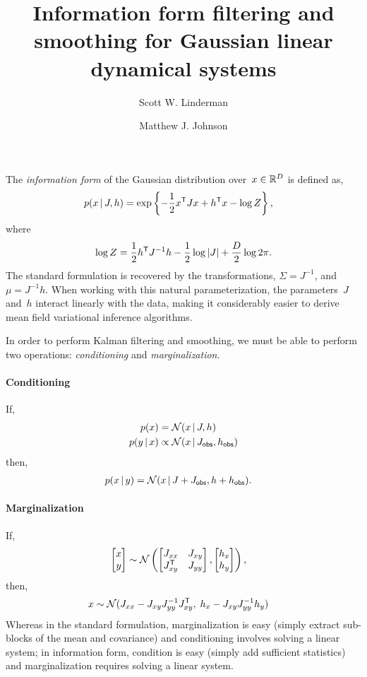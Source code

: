 \documentclass{article}
\title{Information form filtering and smoothing for Gaussian linear dynamical systems}
\author{Scott W. Linderman 
  \and
  Matthew J. Johnson 
}
\begin{document}
\singlespacing
\maketitle
\onehalfspacing

The \emph{information form} of the Gaussian distribution over~$x \in \mathbb{R}^D$ is defined as,
\begin{align}
  p(x \,|\, J, h) 
  &=  \exp \left \{ -\frac{1}{2} x^{\mathsf{T}} J x + h^{\mathsf{T}} x - \log Z \right \},
\end{align}
where
\begin{align}
  \log Z = \frac{1}{2} h^{\mathsf{T}} J^{-1} h - \frac{1}{2}\log |J| + \frac{D}{2}\log 2 \pi.
\end{align}
The standard formulation is recovered by the
transformations, $\Sigma = J^{-1}$, and $\mu = J^{-1} h$. When working
with this natural parameterization, the parameters~$J$ and~$h$
interact linearly with the data, making it considerably easier to
derive mean field variational inference algorithms.

In order to perform Kalman filtering and smoothing, we must be able to perform
two operations: \emph{conditioning} and \emph{marginalization}. 

\paragraph{Conditioning}
If,
\begin{align}
  p(x) &= \mathcal{N}(x \,|\, J, h) \\
  p(y \,|\, x) &\propto \mathcal{N}(x \,|\, J_{\sf obs}, h_{\sf obs}) 
\end{align}
then,
\begin{align}
  p(x \,|\, y) &= \mathcal{N}(x \,|\, J + J_{\sf obs}, h + h_{\sf obs}).
\end{align}

\paragraph{Marginalization}
If,
\begin{align}
  \begin{bmatrix} x \\ y  \end{bmatrix}
  &\sim
  \mathcal{N} \left(
  \begin{bmatrix} 
    J_{xx}        & J_{xy} \\
    J_{xy}^{\mathsf{T}} & J_{yy} 
  \end{bmatrix},
  \begin{bmatrix} h_{x} \\ h_y \end{bmatrix}
  \right),
\end{align}
then,
\begin{align}
  x &\sim \mathcal{N}(
        J_{xx} - J_{xy}J_{yy}^{-1} J_{xy}^{\mathsf{T}}, \;
        h_x - J_{xy} J_{yy}^{-1} h_y)
\end{align}
Whereas in the standard formulation, marginalization is easy (simply extract
sub-blocks of the mean and covariance) and conditioning involves solving a linear system; 
in information form, condition is easy (simply add sufficient statistics) and 
marginalization requires solving a linear system.
\end{document}
